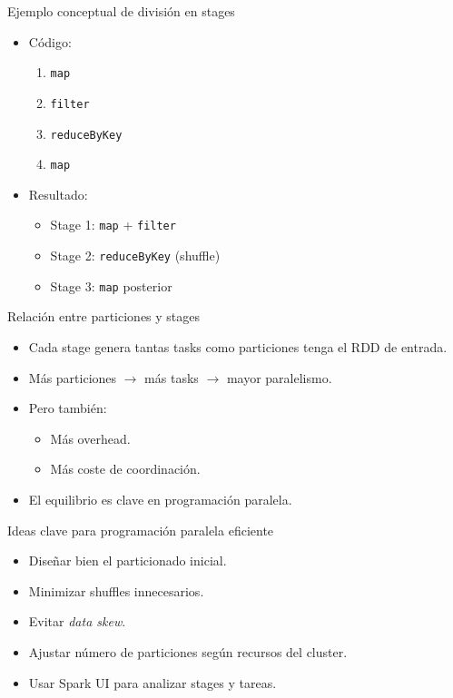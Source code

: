 \documentclass{beamer}
\begin{document}
\begin{frame}{Ejemplo conceptual de división en stages}
\begin{itemize}
  \item Código:
  \begin{enumerate}
    \item \texttt{map}
    \item \texttt{filter}
    \item \texttt{reduceByKey}
    \item \texttt{map}
  \end{enumerate}
  \item Resultado:
  \begin{itemize}
    \item Stage 1: \texttt{map} + \texttt{filter}
    \item Stage 2: \texttt{reduceByKey} (shuffle)
    \item Stage 3: \texttt{map} posterior
  \end{itemize}
\end{itemize}
\end{frame}

\begin{frame}{Relación entre particiones y stages}
\begin{itemize}
  \item Cada stage genera tantas tasks como particiones tenga el RDD de entrada.
  \item Más particiones $\rightarrow$ más tasks $\rightarrow$ mayor paralelismo.
  \item Pero también:
  \begin{itemize}
    \item Más overhead.
    \item Más coste de coordinación.
  \end{itemize}
  \item El equilibrio es clave en programación paralela.
\end{itemize}
\end{frame}

\begin{frame}{Ideas clave para programación paralela eficiente}
\begin{itemize}
  \item Diseñar bien el particionado inicial.
  \item Minimizar shuffles innecesarios.
  \item Evitar \emph{data skew}.
  \item Ajustar número de particiones según recursos del cluster.
  \item Usar Spark UI para analizar stages y tareas.
\end{itemize}
\end{frame}
\end{document}
